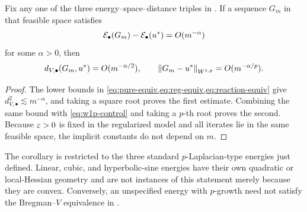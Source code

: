 \begin{corollary}
\label{cor:metric-rates}
Fix any one of the three energy--space--distance triples in . If a sequence
\(G_m\) in that feasible space satisfies
 \begin{equation}
 \mathcal{E}_\bullet(G_m)-\mathcal{E}_\bullet(u^*)=O(m^{-\alpha})
 \label{eq:assumed-energy-rate}
 \end{equation}
for some \(\alpha>0\), then
 \begin{equation}
 d_{V,\bullet}(G_m,u^*)=O(m^{-\alpha/2}),
 \qquad
 \left\lVert G_m-u^*\right\rVert_{W^{1,p}}=O(m^{-\alpha/p}).
\label{eq:metric-rates}
 \end{equation}
\end{corollary}

\begin{proof}
The lower bounds in \cref{eq:pure-equiv,eq:reg-equiv,eq:reaction-equiv} give
\(d_{V,\bullet}^2\lesssim m^{-\alpha}\), and taking a square root proves the first estimate. Combining
the same bound with \cref{eq:w1p-control} and taking a \(p\)-th root proves the second. Because
\(\varepsilon>0\) is fixed in the regularized model and all iterates lie in the same feasible space, the
implicit constants do not depend on \(m\).
\end{proof}

\begin{remark}[Scope]
The corollary is restricted to the three standard \(p\)-Laplacian-type energies just defined. Linear,
cubic, and hyperbolic-sine energies have their own quadratic or local-Hessian geometry and are not
instances of this statement merely because they are convex. Conversely, an unspecified energy with
\(p\)-growth need not satisfy the Bregman--\(V\) equivalence in .
\end{remark}
